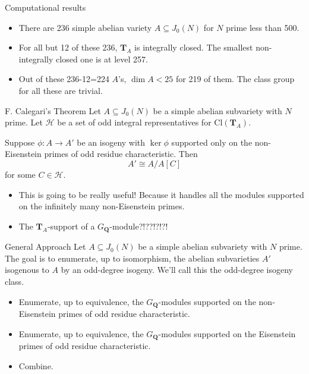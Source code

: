 \documentclass{beamer}
\newcommand{\QQ}{\mathbf{Q}}
\newcommand{\TT}{\mathbf{T}}
\renewcommand{\H}{\mathcal{H}}
\newcommand{\Cl}{\mathrm{Cl}}
\begin{document}
\begin{frame}{Computational results}
    \begin{itemize}
        \item 
            There are 236 simple abelian variety $A\subseteq J_0(N)$ for $N$
            prime less than 500.
        \item
            For all but 12 of these 236, $\TT_A$ is integrally closed. The smallest
            non-integrally closed one is at level 257.
        \item
            Out of these 236-12=224 $A$'s, $\dim A<25$ for 219 of them. The
            class group for all these are trivial.
    \end{itemize}
\end{frame}

\begin{frame}{F. Calegari's Theorem}
    Let $A\subseteq J_0(N)$ be a simple abelian subvariety with $N$ prime. Let
    $\H$ be a set of odd integral representatives for $\Cl(\TT_A)$.
    \begin{theorem}[F. Calegari]
        Suppose $\phi:A\to A'$ be an isogeny with $\ker\phi$ supported only on the
        non-Eisenstein primes of odd residue characteristic. Then
        \[
            A'\cong A/A[C]
        \]
        for some $C\in \H$.
    \end{theorem}
            \pause
    \begin{itemize}
        \item
            This is going to be really useful! Because it handles all the
            modules supported on the infinitely many non-Eisenstein primes.
            \pause
        \item
            The $\TT_A$-support of a $G_\QQ$-module?!??!?!?!
    \end{itemize}
\end{frame}

\begin{frame}{General Approach}
    Let $A\subseteq J_0(N)$ be a simple abelian subvariety with $N$ prime. The
    goal is to enumerate, up to isomorphism, the abelian subvarieties $A'$
    isogenous to $A$ by an odd-degree isogeny. We'll call this the odd-degree
    isogeny class.
            \pause
    \begin{itemize}
        \item 
            Enumerate, up to equivalence, the $G_\QQ$-modules supported on the
            non-Eisenstein primes of odd residue characteristic.
            \pause
        \item 
            Enumerate, up to equivalence, the $G_\QQ$-modules supported on the
            Eisenstein primes of odd residue characteristic.
            \pause
        \item
            Combine.
    \end{itemize}
\end{frame}
\end{document}
